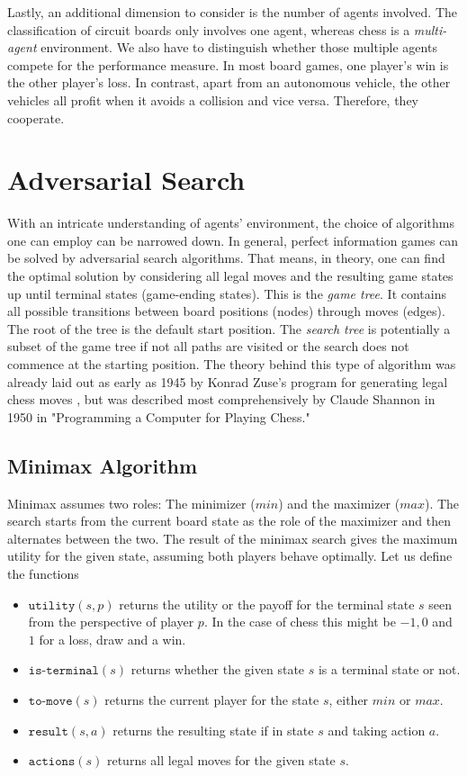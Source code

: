 Lastly, an additional dimension to consider is the number of agents involved. The classification of circuit boards only involves one agent, whereas chess is a \textit{multi-agent} environment. We also have to distinguish whether those multiple agents compete for the performance measure. In most board games, one player's win is the other player's loss. In contrast, apart from an autonomous vehicle, the other vehicles all profit when it avoids a collision and vice versa. Therefore, they cooperate.

\section{Adversarial Search}
With an intricate understanding of agents' environment, the choice of algorithms one can employ can be narrowed down. In general, perfect information games can be solved by adversarial search algorithms. That means, in theory, one can find the optimal solution by considering all legal moves and the resulting game states up until terminal states (game-ending states). This is the \textit{game tree}. It contains all possible transitions between board positions (nodes) through moves (edges). The root of the tree is the default start position. The \textit{search tree} is potentially a subset of the game tree if not all paths are visited or the search does not commence at the starting position. The theory behind this type of algorithm was already laid out as early as 1945 by Konrad Zuse's program for generating legal chess moves \cite{knuth_early_1980}, but was described most comprehensively by Claude Shannon in 1950 in "Programming a Computer for Playing Chess." \cite{shannon_xxii_1950}

\subsection{Minimax Algorithm}
Minimax assumes two roles: The minimizer ($min$) and the maximizer ($max$). The search starts from the current board state as the role of the maximizer and then alternates between the two. The result of the minimax search gives the maximum utility for the given state, assuming both players behave optimally. Let us define the functions \cite[p. 303f.]{russell_artificial_2021}
\begin{itemize}
    \item $\texttt{utility}(s, p)$ returns the utility or the payoff for the terminal state $s$ seen from the perspective of player $p$. In the case of chess this might be $-1, 0$ and $1$ for a loss, draw and a win.
    \item $\texttt{is-terminal}(s)$ returns whether the given state $s$ is a terminal state or not.
    \item $\texttt{to-move}(s)$ returns the current player for the state $s$, either $min$ or $max$.
    \item $\texttt{result}(s, a)$ returns the resulting state if in state $s$ and taking action $a$.
    \item $\texttt{actions}(s)$ returns all legal moves for the given state $s$.
\end{itemize}


